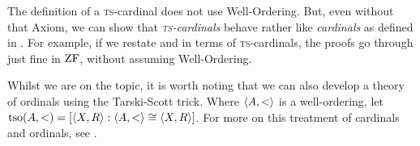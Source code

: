 \documentclass[../../../include/open-logic-section]{subfiles}
\begin{document}
The definition of a \textsc{ts}-cardinal does not use Well-Ordering.
But, even without that Axiom, we can show that
\emph{\textsc{ts}-cardinals} behave rather like \emph{cardinals} as
defined in .
For example, if we restate
 and
 in terms of
\textsc{ts}-cardinals, the proofs go through just fine in $\mathrm{ZF}$,
without assuming Well-Ordering. 

Whilst we are on the topic, it is worth noting that we can also
develop a theory of ordinals using the Tarski-Scott trick. Where
$\langle A, < \rangle$ is a well-ordering, let $\text{tso}(A, <) = [\langle X,
R \rangle : \langle A, < \rangle \cong \langle X, R \rangle]$. For more on this treatment
of cardinals and ordinals, see \citet[chs.~9--12]{Potter2004}.
\end{document}
